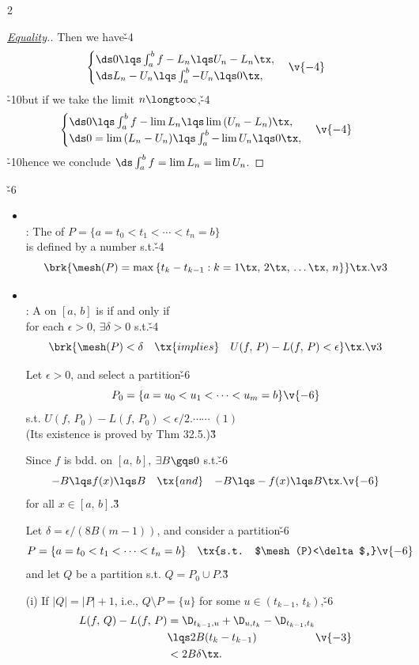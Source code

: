 \documentclass[dvipdfmx,a4paper,titlepage,9pt]{jsarticle}
\begin{document}
\begin{multicols*}{2}
\begin{itemize}[label={-}]
\begin{itemize}[label=\Cdot]
\begin{pfbox}
\begin{proof}[\color{TGreen}\ul{Equality}.]
Then we have\v{-4}
$$\begin{cases}\ds0\lqs\int_a^bf-L_n\lqs U_n-L_n\tx,\\\ds L_n-U_n\lqs\int_a^b-U_n\lqs0\tx,\end{cases}\v{-4}$$
\h{-10}but if we take the limit $n\longto\infty$,\v{-4}
$$\begin{cases}\ds0\lqs\int_a^bf-\lim L_n\lqs \lim{}(U_n-L_n)\tx,\\\ds0=\lim{}(L_n-U_n)\lqs\int_a^b-\lim U_n\lqs0\tx,\end{cases}\v{-4}$$
\h{-10}hence we conclude $\ds\int_a^bf=\lim L_n=\lim U_n$.
\end{proof}
\end{pfbox}\;
\end{itemize}
\end{itemize}

\vfill\null\columnbreak

\v{-6}
\begin{itemize}[label={-}]
\item{}\\
: The  of $P=\{a=t_0<t_1<\cdots<t_n=b\}$\\
\;\;is defined by a number s.t.\v{-4}
$$\brk{\mesh(P)=\max{}\{t_k-t_{k-1}:k=1\tx,\,2\tx,\,\ldots\tx,\,n\}}\tx.\v3$$

\item{}\\
: A  on $[a,\,b]$ is  if and only if\\
\;\; for each $\epsilon>0$, $\exists\delta>0$ s.t.\v{-4}
$$\brk{\mesh(P)<\delta\quad\tx{implies}\quad U(f,\,P)-L(f,\,P)<\epsilon}\tx.\v3$$

\begin{Pfbox}[($\Longto$)]
Let $\epsilon>0$, and select a partition\v{-6}
$$P_0=\{a=u_0<u_1<\cdots<u_m=b\}\v{-6}$$
s.t. $U(f,\,P_0)-L(f,\,P_0)<\epsilon/2$.\hfill$\cdots\cdots\;(1)$\\
(Its existence is proved by Thm 32.5.)\v3

Since $f$ is bdd. on $[a,\,b]$, $\exists B\gqs 0$ s.t.\v{-6}
$$-B\lqs f(x)\lqs B\quad\tx{and}\quad{-B\lqs -f(x)\lqs B}\tx.\v{-6}$$
for all $x\in[a,\,b]$.\v3

Let $\delta=\epsilon/(8B(m-1))$, and consider a partition\v{-6}
$$P=\{a=t_0<t_1<\cdots<t_n=b\}\quad\tx{s.t. $\mesh(P)<\delta$,}\v{-6}$$
and let $Q$ be a partition s.t. $Q=P_0\cup P$.\v3

(i) If $|Q|=|P|+1$, i.e., $Q\setminus P=\{u\}$ for some $u\in(t_{k-1},\,t_k)$,\v{-6}
$$\begin{aligned}
L(f,\,Q)-L(f,\,P)&=\D_{t_{k-1},u}+\D_{u,t_k}-\D_{t_{k-1},t_k}\\
&\lqs 2B(t_k-t_{k-1})\\
&< 2B\delta\tx.
\end{aligned}\v{-3}$$


\end{Pfbox}
\end{itemize}
\end{multicols*}
\end{document}
